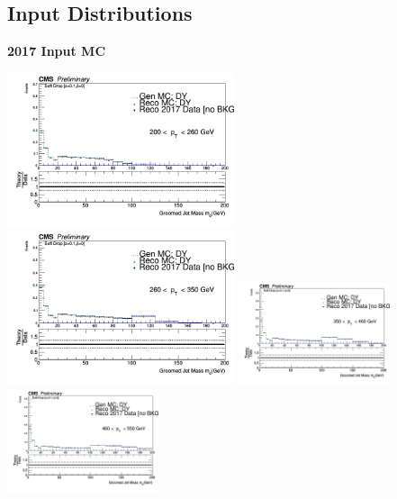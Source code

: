 \documentclass{beamer}
\begin{document}
\subsection{Input Distributions}

\begin{frame}{\textbf{2017 Input MC}}



\includegraphics[width=0.5\textwidth]{Jun25_unfoldPlots_sdB0/InputlocalrecobinnedMC_mass_Ptbin200to260_Detbinning_Groomingis_sdB0.png}%
\includegraphics[width=0.5\textwidth]{Jun25_unfoldPlots_sdB0/InputlocalrecobinnedMC_mass_Ptbin260to350_Detbinning_Groomingis_sdB0.png}
\newline
\includegraphics[width=0.3333\textwidth]{Jun25_unfoldPlots_sdB0/InputlocalrecobinnedMC_mass_Ptbin350to460_Detbinning_Groomingis_sdB0.png}%
\includegraphics[width=0.3333\textwidth]{Jun25_unfoldPlots_sdB0/InputlocalrecobinnedMC_mass_Ptbin460to550_Detbinning_Groomingis_sdB0.png}

\end{frame}
\end{document}
